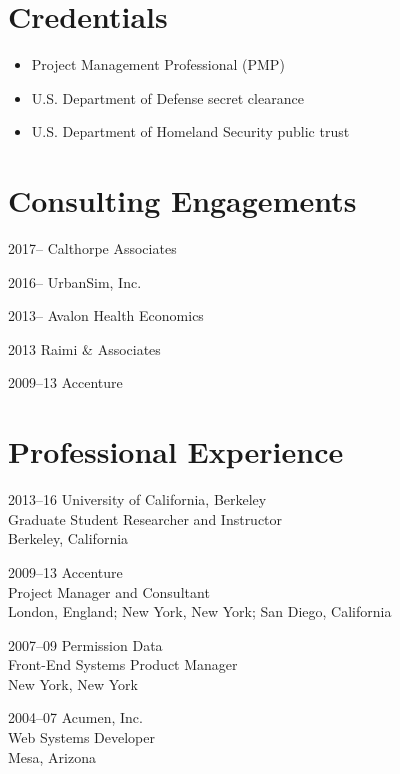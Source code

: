 \documentclass{academiccv}
\begin{document}
\section*{Credentials}

\begin{itemize}
\item Project Management Professional (PMP)
\item U.S. Department of Defense secret clearance
\item U.S. Department of Homeland Security public trust
\end{itemize}



\section*{Consulting Engagements}

\begin{tablist}
\item[2017--]   \tab Calthorpe Associates
\item[2016--]   \tab UrbanSim, Inc.
\item[2013--]   \tab Avalon Health Economics
\item[2013]     \tab Raimi \& Associates
\item[2009--13] \tab Accenture
\end{tablist}



\section*{Professional Experience}

\begin{tablist}
\item[2013--16] \tab University of California, Berkeley \\
                     Graduate Student Researcher and Instructor \\
                     Berkeley, California

\item[2009--13] \tab Accenture \\
                     Project Manager and Consultant \\
                     London, England; New York, New York; San Diego, California

\item[2007--09] \tab Permission Data \\
                     Front-End Systems Product Manager \\
                     New York, New York

\item[2004--07] \tab Acumen, Inc. \\
                     Web Systems Developer \\
                     Mesa, Arizona
\end{tablist}
\end{document}
